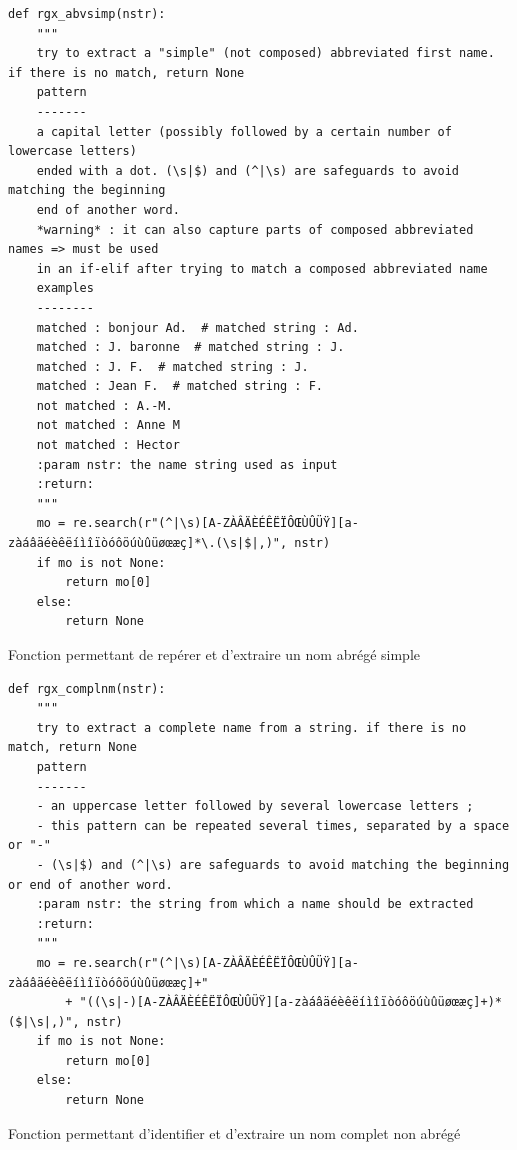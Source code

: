 \begin{listing}[p]
	\begin{verbatim}
def rgx_abvsimp(nstr):
	"""
	try to extract a "simple" (not composed) abbreviated first name. if there is no match, return None
	pattern
	-------
	a capital letter (possibly followed by a certain number of lowercase letters)
	ended with a dot. (\s|$) and (^|\s) are safeguards to avoid matching the beginning
	end of another word.
	*warning* : it can also capture parts of composed abbreviated names => must be used
	in an if-elif after trying to match a composed abbreviated name
	examples
	--------
	matched : bonjour Ad.  # matched string : Ad.
	matched : J. baronne  # matched string : J.
	matched : J. F.  # matched string : J.
	matched : Jean F.  # matched string : F.
	not matched : A.-M.
	not matched : Anne M
	not matched : Hector
	:param nstr: the name string used as input
	:return:
	"""
	mo = re.search(r"(^|\s)[A-ZÀÂÄÈÉÊËÏÔŒÙÛÜŸ][a-zàáâäéèêëíìîïòóôöúùûüøœæç]*\.(\s|$|,)", nstr)
	if mo is not None:
		return mo[0]
	else:
		return None
	\end{verbatim}
	\caption{Fonction permettant de repérer et d'extraire un nom abrégé simple}
	\label{appendix:rgxabvsimp}
\end{listing}

\begin{listing}[p]
	\begin{verbatim}
def rgx_complnm(nstr):
	"""
	try to extract a complete name from a string. if there is no match, return None
	pattern
	-------
	- an uppercase letter followed by several lowercase letters ;
	- this pattern can be repeated several times, separated by a space or "-"
	- (\s|$) and (^|\s) are safeguards to avoid matching the beginning or end of another word.
	:param nstr: the string from which a name should be extracted
	:return:
	"""
	mo = re.search(r"(^|\s)[A-ZÀÂÄÈÉÊËÏÔŒÙÛÜŸ][a-zàáâäéèêëíìîïòóôöúùûüøœæç]+"
		+ "((\s|-)[A-ZÀÂÄÈÉÊËÏÔŒÙÛÜŸ][a-zàáâäéèêëíìîïòóôöúùûüøœæç]+)*($|\s|,)", nstr)
	if mo is not None:
		return mo[0]
	else:
		return None
	\end{verbatim}
	\caption{Fonction permettant d'identifier et d'extraire un nom complet non abrégé}
	\label{appendix:rgxfull}
\end{listing}

